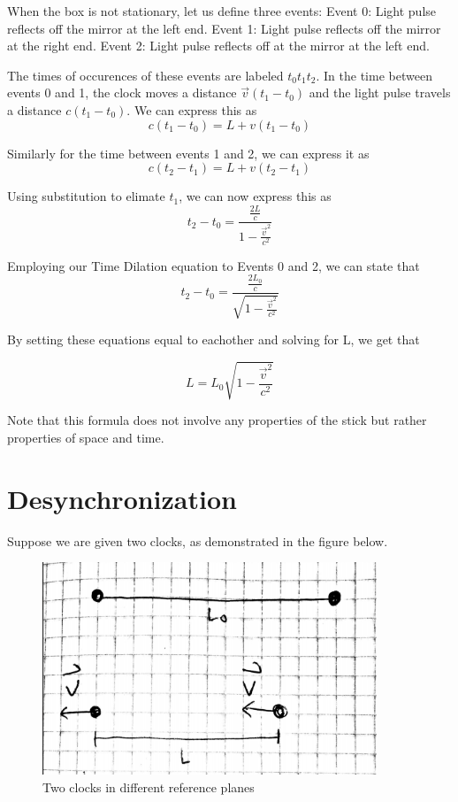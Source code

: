 \documentclass{article}
\begin{document}
When the box is not stationary, let us define three events:\newline
Event 0: Light pulse reflects off the mirror at the left end.\newline
Event 1: Light pulse reflects off the mirror at the right end.\newline
Event 2: Light pulse reflects off at the mirror at the left end.\newline

The times of occurences of these events are labeled \(t_0 t_1 t_2\). In the time between events 0 and 1, the clock moves a distance \(\vec{v}(t_1 - t_0)\) and the light pulse travels a distance \(c(t_1 - t_0)\). We can express this as
\[
  c(t_1 - t_0) = L + v(t_1 - t_0)
\]

Similarly for the time between events 1 and 2, we can express it as
\[
  c(t_2 - t_1) = L + v(t_2 - t_1)
\]

Using substitution to elimate \(t_1\), we can now express this as
\[
  t_2 - t_0 = \frac{\frac{2L}{c}}{1 - \frac{\vec{v}^2}{c^2}}
\]

Employing our Time Dilation equation to Events 0 and 2, we can state that
\[
  t_2 - t_0 = \frac{\frac{2L_0}{c}}{\sqrt{1 - \frac{\vec{v}^2}{c^2}}}
\]

By setting these equations equal to eachother and solving for L, we get that

\[
  L = L_0\sqrt{1 - \frac{\vec{v}^2}{c^2}}
\]

Note that this formula does not involve any properties of the stick but rather properties of space and time. 

\newpage
\section{Desynchronization}
Suppose we are given two clocks, as demonstrated in the figure below.
\begin{figure}[!htb]
  \centering
  \includegraphics[width=100mm]{desync1}\par
  \caption{Two clocks in different reference planes}
\end{figure}
\end{document}
